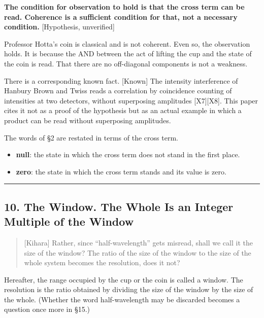 \documentclass[
  a4paper,
]{article}
\providecommand{\tightlist}{%
  \setlength{\itemsep}{0pt}\setlength{\parskip}{0pt}}
\begin{document}
\textbf{The condition for observation to hold is that the cross term can
be read. Coherence is a sufficient condition for that, not a necessary
condition.} {[}Hypothesis, unverified{]}

Professor Hotta's coin is classical and is not coherent. Even so, the
observation holds. It is because the AND between the act of lifting the
cup and the state of the coin is read. That there are no off-diagonal
components is not a weakness.

There is a corresponding known fact. {[}Known{]} The intensity
interference of Hanbury Brown and Twiss reads a correlation by
coincidence counting of intensities at two detectors, without
superposing amplitudes {[}X7{]}{[}X8{]}. This paper cites it not as a
proof of the hypothesis but as an actual example in which a product can
be read without superposing amplitudes.

The words of §2 are restated in terms of the cross term.

\begin{itemize}
\tightlist
\item
  \textbf{null}: the state in which the cross term does not stand in the
  first place.
\item
  \textbf{zero}: the state in which the cross term stands and its value
  is zero.
\end{itemize}

\begin{center}\rule{0.5\linewidth}{0.5pt}\end{center}

\subsection{10. The Window. The Whole Is an Integer Multiple of the
Window}\label{the-window.-the-whole-is-an-integer-multiple-of-the-window}

\begin{quote}
{[}Kihara{]} Rather, since ``half-wavelength'' gets misread, shall we
call it the size of the window? The ratio of the size of the window to
the size of the whole system becomes the resolution, does it not?
\end{quote}

Hereafter, the range occupied by the cup or the coin is called a window.
The resolution is the ratio obtained by dividing the size of the window
by the size of the whole. (Whether the word half-wavelength may be
discarded becomes a question once more in §15.)
\end{document}
